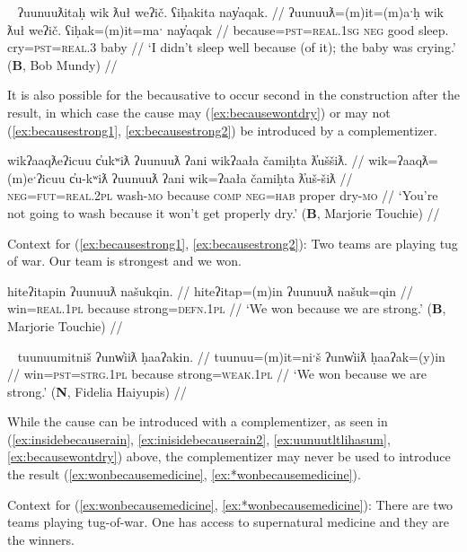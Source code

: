 \ex~ \label{ex:whydidntsleep}
\begingl
\glpreamble ʔuunuuƛitaḥ wik ƛuł weʔič. ʕiḥakita nay̓aqak. //
\gla ʔuunuuƛ=(m)it=(m)aˑḥ wik ƛuł weʔič. ʕiḥak=(m)it=maˑ nay̓aqak //
\glb because=\textsc{pst}=\textsc{real.1sg} \textsc{neg} good sleep. cry=\textsc{pst}=\textsc{real.3} baby //
\glft `I didn't sleep well because (of it); the baby was crying.' (\textbf{B}, Bob Mundy) //
\endgl
\xe

It is also possible for the becausative to occur second in the construction after the result, in which case the cause may (\ref{ex:becausewontdry}) or may not (\ref{ex:becausestrong1}, \ref{ex:becausestrong2}) be introduced by a complementizer.

\ex \label{ex:becausewontdry}
\begingl
\glpreamble wikʔaaqƛeʔicuu c̓ukʷiƛ ʔuunuuƛ ʔani wikʔaała čamiḥta ƛ̓uššiƛ. //
\gla wik=ʔaaqƛ=(m)eˑʔicuu c̓u-kʷiƛ ʔuunuuƛ ʔani wik=ʔaała čamiḥta ƛ̓uš-šiƛ //
\glb \textsc{neg}=\textsc{fut}=\textsc{real.2pl} wash-\textsc{mo} because \textsc{comp} \textsc{neg}=\textsc{hab} proper dry-\textsc{mo} //
\glft `You're not going to wash because it won't get properly dry.' (\textbf{B}, Marjorie Touchie) //
\endgl
\xe

\vspace{5pt}

\noindent Context for (\ref{ex:becausestrong1}, \ref{ex:becausestrong2}): Two teams are playing tug of war. Our team is strongest and we won.

\ex \label{ex:becausestrong1}
\begingl
\glpreamble hiteʔitapin ʔuunuuƛ našukqin. //
\gla hiteʔitap=(m)in ʔuunuuƛ našuk=qin //
\glb win=\textsc{real.1pl} because strong=\textsc{defn.1pl} //
\glft `We won because we are strong.' (\textbf{B}, Marjorie Touchie) //
\endgl
\xe

\ex~ \label{ex:becausestrong2}
\begingl
\glpreamble tuunuumitniš ʔunw̓iiƛ ḥaaʔakin. //
\gla tuunuu=(m)it=niˑš ʔunw̓iiƛ ḥaaʔak=(y)in //
\glb win=\textsc{pst}=\textsc{strg.1pl} because strong=\textsc{weak.1pl} //
\glft `We won because we are strong.' (\textbf{N}, Fidelia Haiyupis) //
\endgl
\xe


While the cause can be introduced with a complementizer, as seen in (\ref{ex:insidebecauserain}, \ref{ex:inisidebecauserain2}, \ref{ex:uunuutltlihasum}, \ref{ex:becausewontdry}) above, the complementizer may never be used to introduce the result (\ref{ex:wonbecausemedicine}, \ref{ex:*wonbecausemedicine}).

\vspace{5pt}

\noindent Context for (\ref{ex:wonbecausemedicine}, \ref{ex:*wonbecausemedicine}): There are two teams playing tug-of-war. One has access to supernatural medicine and they are the winners.

